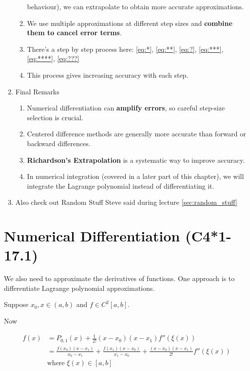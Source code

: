 \documentclass[12pt]{article}
\begin{document}
\begin{enumerate}
\begin{enumerate}[label=(\alph*)]
        behaviour), we can extrapolate to obtain more accurate approximations.
      \item We use multiple approximations at different step sizes and
        \textbf{combine them to cancel error terms}.
      \item There's a step by step process here: \eqref{eq:*}, \eqref{eq:**},
        \eqref{eq:?}, \eqref{eq:***}, \eqref{eq:****}, \eqref{eq:???}
      \item This process gives increasing accuracy with each step.
    \end{enumerate}
  \item Final Remarks
    \begin{enumerate}[label=(\alph*)]
      \item Numerical differentiation can \textbf{amplify errors}, so careful
        step-size selection is crucial.
      \item Centered difference methods are generally more accurate than forward
        or backward differences.
      \item \textbf{Richardson's Extrapolation} is a systematic way to improve
        accuracy.
      \item In numerical integration (covered in a later part of this chapter),
        we will integrate the Lagrange polynomial instead of differentiating it.
    \end{enumerate}
  \item Also check out Random Stuff Steve said during lecture \ref{sec:random_stuff}
\end{enumerate}

\section{Numerical Differentiation (C4*1-17.1)}\label{sec:numerical_differentiation}

We also need to approximate the derivatives of functions. One approach is to
differentiate Lagrange polynomial approximations.

Suppose $x_0, x \in (a, b)$ and $f\in C^2[a,b]$.

Now

\begin{align*}
    f(x) &= P_{0,1}(x) + \frac{1}{2!} (x - x_0)(x - x_1) f''(\xi(x)) \\
         &= \frac{f(x_0)(x - x_1)}{x_0 - x_1} + \frac{f(x_1)(x - x_0)}{x_1 - x_0} 
         + \frac{(x - x_0)(x - x_1)}{2!} f''(\xi(x)) \\
         &\text{where } \xi(x) \in [a, b]
\end{align*}
\end{document}
